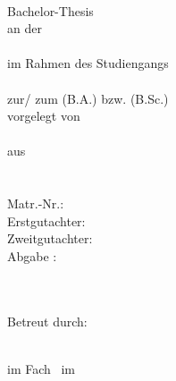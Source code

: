 \documentclass[a4paper, 11pt, german ]{article}
\def\True{1}
\begin{document}


\if\parenthesisCite\True
	\let\cite\parencite
\fi

\begin{titlepage}
\if\BachlorThesis\True
	\vspace*{20ex}
	\begin{center}

		\textbf{\thetitle}\\
		\vspace{10ex}
		Bachelor-Thesis\\
		an der \\
		\Hochschulname\\
		im Rahmen des Studiengangs \\
		\Studiengang \\
		zur/ zum \Abschlussbezeinung (B.A.) bzw. (B.Sc.) \\

		\vspace{1ex}
		vorgelegt von \\
		\theauthor \\
		aus\\
		\Addresse\\
		\Email\\

		\vspace{1ex}
		Matr.-Nr.: \MatrNummer\\

		\vspace{10ex}
		Erstgutachter: \Pruefer \\
		Zweitgutachter: \ZweitGutachter \\
		\vspace{1ex}
		Abgabe : \thedate
	\end{center}

\else


\raggedright
\vspace*{20ex}
\Hochschulname \\
\Studiengang\\
Betreut durch: \Pruefer

\vspace{10ex}
\begin{center}
	\ArtArbeit\\
	\vspace{1ex}
	im Fach \Modul~im \Semester\\


\end{center}
\end{titlepage}
\end{document}
